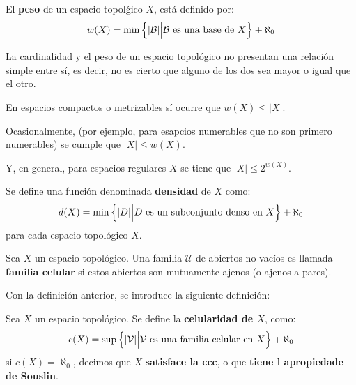 \documentclass[12pt]{report}
\theoremstyle{largebreak}
\newcommand\abs[1]{\ensuremath{\lvert#1\rvert}}
\begin{document}
    \begin{mydef}
        El \textbf{peso} de un espacio topolǵico $X$, está definido por:
        \begin{equation*}
            w(X)=\min\left\{\abs{\mathcal{B}}\Big|\mathcal{B}\textup{ es una base de }X \right\}+\aleph_0
        \end{equation*}
    \end{mydef}

    \begin{obs}
        La cardinalidad y el peso de un espacio topológico no presentan una relación simple entre sí, es decir, no es cierto que alguno de los dos sea mayor o igual que el otro.

        En espacios compactos o metrizables sí ocurre que $w(X)\leq\abs{X}$.

        Ocasionalmente, (por ejemplo, para esapcios numerables que no son primero numerables) se cumple que $\abs{X}\leq w(X)$.

        Y, en general, para espacios regulares $X$ se tiene que $\abs{X}\leq 2^{w(X)}$.
    \end{obs}

    \begin{mydef}
        Se define una función denominada \textbf{densidad} de $X$ como:
        \begin{equation*}
            d(X)=\min\left\{\abs{D}\Big|D\textup{ es un subconjunto denso en }X \right\}+\aleph_0
        \end{equation*}
        para cada espacio topológico $X$.
    \end{mydef}

    \begin{mydef}
        Sea $X$ un espacio topológico. Una familia $\mathcal{U}$ de abiertos no vacíos es llamada \textbf{familia celular} si estos abiertos son mutuamente ajenos (o ajenos a pares).
    \end{mydef}

    Con la definición anterior, se introduce la siguiente definición:

    \begin{mydef}
        Sea $X$ un espacio topológico. Se define la \textbf{celularidad de $X$}, como:
        \begin{equation*}
            c(X)=\sup\left\{\abs{\mathcal{V}}\Big|\mathcal{V}\textup{ es una familia celular en }X \right\}+\aleph_0
        \end{equation*}
        si $c(X)=\aleph_0$, decimos que $X$ \textbf{satisface la ccc}, o que \textbf{tiene l apropiedade de Souslin}.
    \end{mydef}
\end{document}
